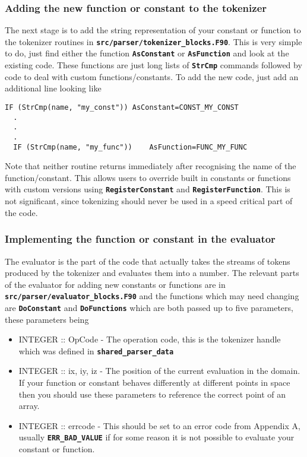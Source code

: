 \documentclass[12pt,a4paper]{article}
\newcommand{\simpleboxverbatim}{\begin{Verbatim}[obeytabs=true,frame=single,
  framerule=0.5mm,rulecolor=\color{warwickmid},formatcom=\color{black}]}
\newcommand{\inlinecode}[1]{{\color{warwickred} \bf\texttt{#1}}}
\begin{document}
\subsubsection{Adding the new function or constant to the tokenizer}
The next stage is to add the string representation of your constant or function
to the tokenizer routines in
\inlinecode{src/parser/tokenizer\_blocks.F90}. This is very simple to do, just
find either the function \inlinecode{AsConstant} or \inlinecode{AsFunction} and
look at the existing code. These functions are just long lists of
\inlinecode{StrCmp} commands followed by code to deal with custom
functions/constants. To add the new code, just add an additional line looking
like
\simpleboxverbatim
  IF (StrCmp(name, "my_const")) AsConstant=CONST_MY_CONST
  .
  .
  .
  IF (StrCmp(name, "my_func"))    AsFunction=FUNC_MY_FUNC
\end{Verbatim}
Note that neither routine returns immediately after recognising the name of the
function/constant. This allows users to override built in constants or
functions with custom versions using \inlinecode{RegisterConstant} and
\inlinecode{RegisterFunction}. This is not significant, since tokenizing should
never be used in a speed critical part of the code.

\subsubsection{Implementing the function or constant in the evaluator}
The evaluator is the part of the code that actually takes the streams of tokens
produced by the tokenizer and evaluates them into a number. The relevant parts
of the evaluator for adding new constants or functions are in
\inlinecode{src/parser/evaluator\_blocks.F90} and the functions which may need
changing are \inlinecode{DoConstant} and \inlinecode{DoFunctions} which are
both passed up to five parameters, these parameters being
\begin{itemize}
\item INTEGER :: OpCode - The operation code, this is the tokenizer handle
  which was defined in \inlinecode{shared\_parser\_data}
\item INTEGER :: ix, iy, iz - The position of the current evaluation in the
  domain. If your function or constant behaves differently at different points
  in space then you should use these parameters to reference the correct point
  of an array.
\item INTEGER :: errcode - This should be set to an error code from Appendix A,
  usually \inlinecode{ERR\_BAD\_VALUE} if for some reason it is not possible to
  evaluate your constant or function.
\end{itemize}
\end{document}
